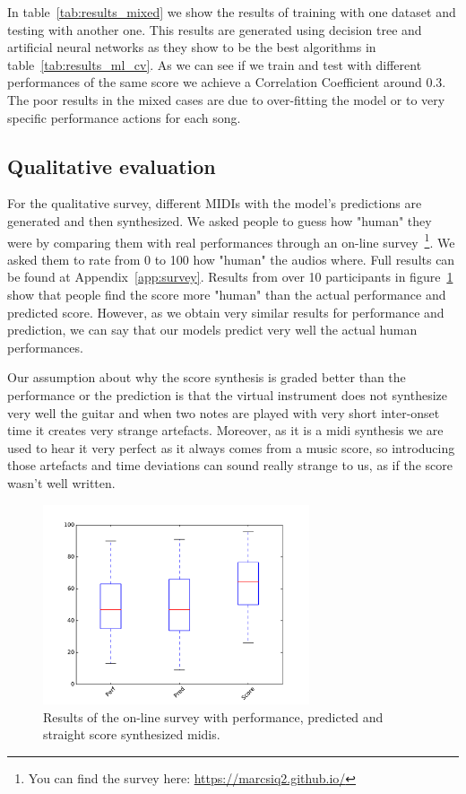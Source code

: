 
%
In table~\ref{tab:results_mixed} we show the results of training with one dataset and testing with another one. This results are generated using decision tree and artificial neural networks as they show to be the best algorithms in table~\ref{tab:results_ml_cv}. As we can see if we train and test with different performances of the same score we achieve a Correlation Coefficient around 0.3. The poor results in the mixed cases are due to over-fitting the model or to very specific performance actions for each song.


\subsection{Qualitative evaluation}

For the qualitative survey, different MIDIs with the model's predictions are generated and then synthesized. We asked people to guess how "human" they were by comparing them with real performances through an on-line survey~\footnote{You can find the survey here: \url{https://marcsiq2.github.io/}}. We asked them to rate from 0 to 100 how "human" the audios where. Full results can be found at Appendix~\ref{app:survey}. Results from over 10 participants in figure~\ref{fig:survey} show that people find the score more "human" than the actual performance and predicted score. However, as we obtain very similar results for performance and prediction, we can say that our models predict very well the actual human performances. 

Our assumption about why the score synthesis is graded better than the performance or the prediction is that the virtual instrument does not synthesize very well the guitar and when two notes are played with very short inter-onset time it creates very strange artefacts. Moreover, as it is a midi synthesis we are used to hear it very perfect as it always comes from a music score, so introducing those artefacts and time deviations can sound really strange to us, as if the score wasn't well written.

\begin{figure}
\caption{Results of the on-line survey with performance, predicted and straight score synthesized midis.}
\label{fig:survey}
\centering
\includegraphics[width=0.7\textwidth]{Figures/survey.pdf}
\end{figure}


\cleardoublepage

